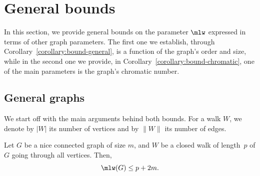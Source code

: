 \documentclass[a4paper,11pt,dvipsnames]{elsarticle}
\begin{document}



\section{General bounds}\label{section:bounds}

In this section, we provide general bounds on the parameter $\mlw$ expressed in terms of other graph parameters. The first one we establish, through Corollary~\ref{corollary:bound-general}, is a function of the graph's order and size, while in the second one we provide, in Corollary~\ref{corollary:bound-chromatic}, one of the main parameters is the graph's chromatic number.

\subsection{General graphs}

We start off with the main arguments behind both bounds. For a walk $W$, we denote by $|W|$ its number of vertices and by $\|W\|$ its number of edges.

\begin{theorem}\label{theorem:bound-general}
Let $G$ be a nice connected graph of size $m$,
and $W$ be a closed walk of length~$p$ of $G$ going through all vertices. 
Then,$$\mlw(G) \leq p+2m.$$
\end{theorem}
\end{document}

